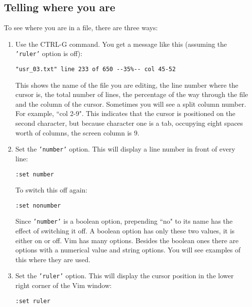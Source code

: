 \subsection{Telling where you are}
To see where you are in a file, there are three ways:
\begin{enumerate}
				\item  Use the CTRL-G command.
								You get a message like this (assuming the \texttt{'ruler'} option is off):
								\begin{Verbatim}[samepage=true]
	"usr_03.txt" line 233 of 650 --35%-- col 45-52 
								\end{Verbatim}

								This shows the name of the file you are editing, the line number where the cursor is, the total number of lines, the percentage of the way through the file and the column of the cursor.
								Sometimes you will see a split column number.
								For example, ``col 2-9".
								This indicates that the cursor is positioned on the second character, but because character one is a tab, occupying eight spaces worth of columns, the screen column is 9.

				\item  Set the \texttt{'number'} option.  This will display a line number in front of
								every line:

								\begin{Verbatim}[samepage=true]
	:set number
								\end{Verbatim}

								To switch this off again:

								\begin{Verbatim}[samepage=true]
	:set nonumber
								\end{Verbatim}

								Since \texttt{'number'} is a boolean option, prepending ``no" to its name has the effect of switching it off.
								A boolean option has only these two values, it is either on or off.
								Vim has many options.
								Besides the boolean ones there are options with a numerical value and string options.
								You will see examples of this where they are used.

				\item  Set the \texttt{'ruler'} option.
								This will display the cursor position in the lower right corner of the Vim window:

								\begin{Verbatim}[samepage=true]
	:set ruler
								\end{Verbatim}

\end{enumerate}

